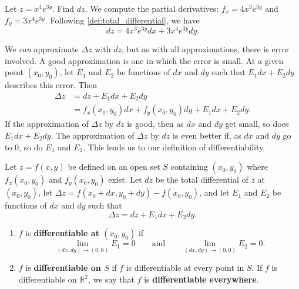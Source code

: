 \begin{example}\label{ex_total_diff_10}
Let $z = x^4e^{3y}$. Find $dz$.
\solution
We compute the partial derivatives: $f_x = 4x^3e^{3y}$ and $f_y = 3x^4e^{3y}$. Following \autoref{def:total_differential}, we have
\[dz = 4x^3e^{3y}dx+3x^4e^{3y}dy.\]
\end{example}

We \emph{can} approximate $\Delta z$ with $dz$, but as with all approximations, there is error involved. A good approximation is one in which the error is small. At a given point $(x_0,y_0)$, let $E_1$ and $E_2$ be functions of $dx$ and $dy$ such that $E_1dx+E_2dy$ describes this error. Then
\begin{align*}
\Delta z &= dz + E_1dx+ E_2dy \\
		&= f_x(x_0,y_0)dx+f_y(x_0,y_0)dy + E_1dx+E_2dy.
\end{align*}
If the approximation of $\Delta z$ by $dz$ is good, then as $dx$ and $dy$ get small,  so does $E_1dx+E_2dy$. The approximation of $\Delta z$ by $dz$ is even better if, as $dx$ and $dy$ go to 0, so do $E_1$ and $E_2$. This leads us to our definition of differentiability.

\begin{definition}\label{def:multi_differentiability}
Let $z=f(x,y)$ be defined on an open set $S$ containing $(x_0,y_0)$ where $f_x(x_0,y_0)$ and $f_y(x_0,y_0)$ exist. Let $dz$ be the total differential of $z$ at $(x_0,y_0)$, let $\Delta z = f(x_0+dx,y_0+dy) - f(x_0,y_0)$, and let $E_1$ and $E_2$ be functions of $dx$ and $dy$  such that 
\[\Delta z = dz + E_1dx + E_2dy.\]
\begin{enumerate}
	\item $f$ is \textbf{differentiable at $(x_0,y_0)$} if%
	\[\lim_{(dx,dy)\to(0,0)}E_1=0\qquad\text{and}\qquad\lim_{(dx,dy)\to(0,0)}E_2=0.\]
	\item $f$ is \textbf{differentiable on $S$} if $f$ is differentiable at every point in $S$. If $f$ is differentiable on $\mathbb{R}^2$, we say that $f$ is \textbf{differentiable everywhere}.
\end{enumerate}
\end{definition}

